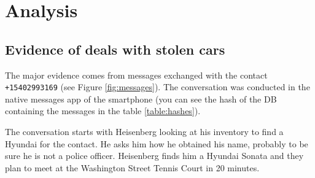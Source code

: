 \documentclass[12pt]{article}
\begin{document}
\section{Analysis}

\subsection{Evidence of deals with stolen cars}

The major evidence comes from messages exchanged with the contact \texttt{+15402993169} (see Figure \ref{fig:messages}). The conversation was conducted in the native messages app of the smartphone (you can see the hash of the DB containing the messages in the table \ref{table:hashes}).

The conversation starts with Heisenberg looking at his inventory to find a Hyundai for the contact. He asks him how he obtained his name, probably to be sure he is not a police officer. Heisenberg finds him a Hyundai Sonata and they plan to meet at the Washington Street Tennis Court in 20 minutes.
\end{document}
